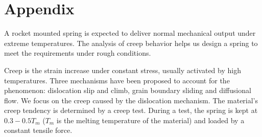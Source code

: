 \documentclass[10pt]{article}
\begin{document}

%






\section{Appendix}
\label{sec:stress}
A rocket mounted spring is expected to deliver normal mechanical output under extreme temperatures. The analysis of creep behavior helps us design a spring to meet the requirements under rough conditions.

Creep is the strain increase under constant stress, usually activated by high temperatures. Three mechanisms have been proposed to account for the phenomenon: dislocation slip and climb, grain boundary sliding and diffusional flow. We focus on the creep caused by the dislocation mechanism. The material's creep tendency is determined by a creep test. During a test, the spring is kept at $0.3-0.5T_m$ ($T_m$ is the melting temperature of the material) and loaded by a constant tensile force.
\end{document}
